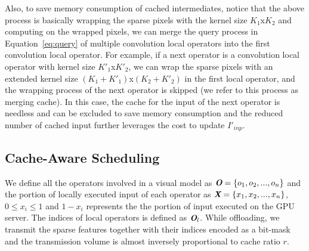 Also, to save memory consumption of cached intermediates, notice that the above process is basically wrapping the sparse pixels with the kernel size $K_1$x$K_2$ and computing on the wrapped pixels, we can merge the query process in Equation~\ref{eq:query} of multiple convolution local operators into the first convolution local operator.
For example, if a next operator is a convolution local operator with kernel size $K'_1$x$K'_2$, we can wrap the sparse pixels with an extended kernel size $(K_1+K'_1)$x$(K_2+K'_2)$ in the first local operator, and the wrapping process of the next operator is skipped (we refer to this process as merging cache).
In this case, the cache for the input of the next operator is needless and can be excluded to save memory consumption and the reduced number of cached input further leverages the cost to update $I'_{inp}$.


\subsection{Cache-Aware Scheduling}
We define all the operators involved in a visual model as $\textit{\textbf{O}} = \{o_1, o_2,...,o_n\}$ and the portion of locally executed input of each operator as $\textit{\textbf{X}}=\{x_1, x_2, ..., x_n\}$, $0\le x_i \le 1$ and $1-x_i$ represents the the portion of input executed on the GPU server.
The indices of local operators is defined as $\textit{\textbf{O}}_l$.
While offloading, we transmit the sparse features together with their indices encoded as a bit-mask and the transmission volume is almost inversely proportional to cache ratio $r$.

